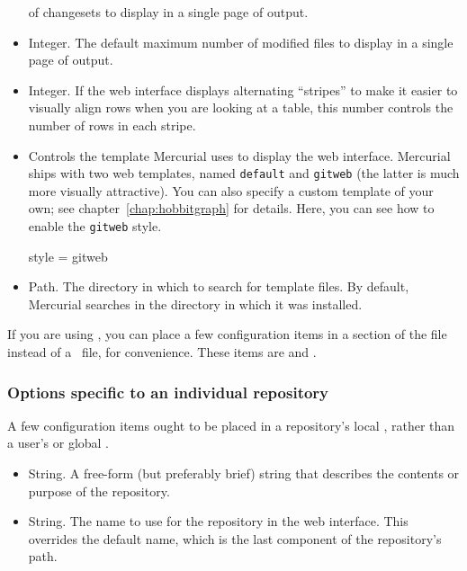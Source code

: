 \begin{itemize}
  of changesets to display in a single page of output.
\item[\rcitem{web}{maxfiles}] Integer.  The default maximum number
  of modified files to display in a single page of output.
\item[\rcitem{web}{stripes}] Integer.  If the web interface displays
  alternating ``stripes'' to make it easier to visually align rows
  when you are looking at a table, this number controls the number of
  rows in each stripe.
\item[\rcitem{web}{style}] Controls the template Mercurial uses to
  display the web interface.  Mercurial ships with two web templates,
  named \texttt{default} and \texttt{gitweb} (the latter is much more
  visually attractive).  You can also specify a custom template of
  your own; see chapter~\ref{chap:hobbitgraph} for details.  Here, you
  can see how to enable the \texttt{gitweb} style.
  \begin{codesample4}
    [web]
    style = gitweb
  \end{codesample4}
\item[\rcitem{web}{templates}] Path.  The directory in which to search
  for template files.  By default, Mercurial searches in the directory
  in which it was installed.
\end{itemize}
If you are using , you can place a few
configuration items in a  section of the
 file instead of a \hgrc\ file, for
convenience.  These items are  and
.

\subsubsection{Options specific to an individual repository}

A few  configuration items ought to be placed in a
repository's local , rather than a user's or
global \hgrc.
\begin{itemize}
\item[\rcitem{web}{description}] String.  A free-form (but preferably
  brief) string that describes the contents or purpose of the
  repository.
\item[\rcitem{web}{name}] String.  The name to use for the repository
  in the web interface.  This overrides the default name, which is the
  last component of the repository's path.
\end{itemize}

